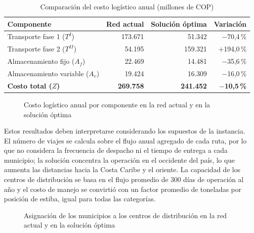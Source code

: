 \documentclass[fleqn, 11pt,letterpaper]{article}
\begin{document}
\begin{table}[H]
\centering
\caption{Comparación del costo logístico anual (millones de COP)}
\label{tab:comparacion}
\begin{tabular}{lrrr}
\toprule
\textbf{Componente} & \textbf{Red actual} & \textbf{Solución óptima} & \textbf{Variación} \\
\midrule
Transporte fase 1 ($T^{I}$)        & 173.671 &  51.342 & $-$70,4\,\% \\
Transporte fase 2 ($T^{II}$)       &  54.195 & 159.321 & $+$194,0\,\% \\
Almacenamiento fijo ($A_f$)        &  22.469 &  14.481 & $-$35,6\,\% \\
Almacenamiento variable ($A_v$)    &  19.424 &  16.309 & $-$16,0\,\% \\
\midrule
\textbf{Costo total ($Z$)}         & \textbf{269.758} & \textbf{241.452} & \textbf{$-$10,5\,\%} \\
\bottomrule
\end{tabular}
\end{table}


\begin{figure}[H]
    \centering
    
    \caption{Costo logístico anual por componente en la red actual y en la solución óptima}
    \label{fig:costos}
\end{figure}

Estos resultados deben interpretarse considerando los supuestos de la instancia. El número de viajes se calcula sobre el flujo anual agregado de cada ruta, por lo que no considera la frecuencia de despacho ni el tiempo de entrega a cada municipio; la solución concentra la operación en el occidente del país, lo que aumenta las distancias hacia la Costa Caribe y el oriente. La capacidad de los centros de distribución se basa en el flujo promedio de 300 días de operación al año y el costo de manejo se convirtió con un factor promedio de toneladas por posición de estiba, igual para todas las categorías.


\begin{figure}[H]
    \centering
    
    \caption{Asignación de los municipios a los centros de distribución en la red actual y en la solución óptima}
    \label{fig:mapa_redes}
\end{figure}
\end{document}
